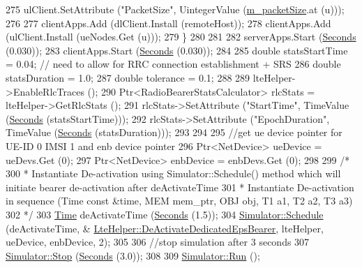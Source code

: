 \begin{DoxyCode}
275       ulClient.SetAttribute (\textcolor{stringliteral}{"PacketSize"}, UintegerValue (\hyperlink{classns3_1_1LenaDeactivateBearerTestCase_a0d6c5b51de98a92178ecaa55b4bfc9df}{m\_packetSize}.at (u)));
276 
277       clientApps.Add (dlClient.Install (remoteHost));
278       clientApps.Add (ulClient.Install (ueNodes.Get (u)));
279     \}
280 
281 
282   serverApps.Start (\hyperlink{group__timecivil_ga33c34b816f8ff6628e33d5c8e9713b9e}{Seconds} (0.030));
283   clientApps.Start (\hyperlink{group__timecivil_ga33c34b816f8ff6628e33d5c8e9713b9e}{Seconds} (0.030));
284 
285   \textcolor{keywordtype}{double} statsStartTime = 0.04; \textcolor{comment}{// need to allow for RRC connection establishment + SRS}
286   \textcolor{keywordtype}{double} statsDuration = 1.0;
287   \textcolor{keywordtype}{double} tolerance = 0.1;
288 
289   lteHelper->EnableRlcTraces ();
290   Ptr<RadioBearerStatsCalculator> rlcStats = lteHelper->GetRlcStats ();
291   rlcStats->SetAttribute (\textcolor{stringliteral}{"StartTime"}, TimeValue (\hyperlink{group__timecivil_ga33c34b816f8ff6628e33d5c8e9713b9e}{Seconds} (statsStartTime)));
292   rlcStats->SetAttribute (\textcolor{stringliteral}{"EpochDuration"}, TimeValue (\hyperlink{group__timecivil_ga33c34b816f8ff6628e33d5c8e9713b9e}{Seconds} (statsDuration)));
293 
294 
295   \textcolor{comment}{//get ue device pointer for UE-ID 0 IMSI 1 and enb device pointer}
296   Ptr<NetDevice> ueDevice = ueDevs.Get (0);
297   Ptr<NetDevice> enbDevice = enbDevs.Get (0);
298 
299   \textcolor{comment}{/*}
300 \textcolor{comment}{   *   Instantiate De-activation using Simulator::Schedule() method which will initiate bearer
       de-activation after deActivateTime}
301 \textcolor{comment}{   *   Instantiate De-activation in sequence (Time const &time, MEM mem\_ptr, OBJ obj, T1 a1, T2 a2, T3 a3)}
302 \textcolor{comment}{   */}
303   \hyperlink{namespacens3_1_1TracedValueCallback_a7ffd3e7c142ffe7c8a1d2db9b8de38ec}{Time} deActivateTime (\hyperlink{group__timecivil_ga33c34b816f8ff6628e33d5c8e9713b9e}{Seconds} (1.5));
304   \hyperlink{classns3_1_1Simulator_a671882c894a08af4a5e91181bf1eec13}{Simulator::Schedule} (deActivateTime, &
      \hyperlink{classns3_1_1LteHelper_a58e90297e466808af034b827870e089e}{LteHelper::DeActivateDedicatedEpsBearer}, lteHelper, ueDevice, 
      enbDevice, 2);
305 
306   \textcolor{comment}{//stop simulation after 3 seconds}
307   \hyperlink{classns3_1_1Simulator_a2335ba5b62e9066e893fecb21b7f6afd}{Simulator::Stop} (\hyperlink{group__timecivil_ga33c34b816f8ff6628e33d5c8e9713b9e}{Seconds} (3.0));
308 
309   \hyperlink{classns3_1_1Simulator_a84be982e6d03b62c3dc3303c75a9b909}{Simulator::Run} ();

\end{DoxyCode}
